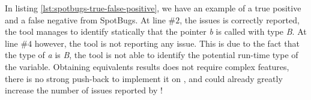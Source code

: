 \begin{enumerate}
	
	
	In listing \ref{lst:spotbugs-true-false-positive}, we have an example of a true positive and a false negative from SpotBugs. At line $\#2$, the issues is correctly reported, the tool manages to identify statically that the pointer \emph{b} is called with type \emph{B}. At line $\#4$ however, the tool is not reporting any issue. This is due to the fact that the type of \emph{a} is \emph{B}, the tool is not able to identify the potential run-time type of the variable.\newline
	Obtaining equivalents results does not require complex features, there is no strong push-back to implement it on \slang{}, and could already greatly increase the number of issues reported by \slang{}!
\end{enumerate}